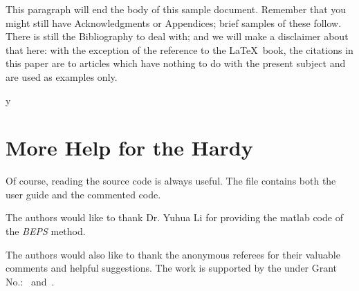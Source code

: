 \documentclass[sigconf]{acmart}
\begin{document}
This paragraph will end the body of this sample document.  Remember
that you might still have Acknowledgments or Appendices; brief samples
of these follow.  There is still the Bibliography to deal with; and we
will make a disclaimer about that here: with the exception of the
reference to the \LaTeX\ book, the citations in this paper are to
articles which have nothing to do with the present subject and are
used as examples only.



y

\section{More Help for the Hardy}

Of course, reading the source code is always useful.  The file
 contains both the user guide and the commented code.

\begin{acks}

  The authors would like to thank Dr. Yuhua Li for providing the
  matlab code of the \textit{BEPS} method.

  The authors would also like to thank the anonymous referees for
  their valuable comments and helpful suggestions. The work is
  supported by the  under Grant
  No.:~
  and~.

\end{acks}


 
\end{document}
